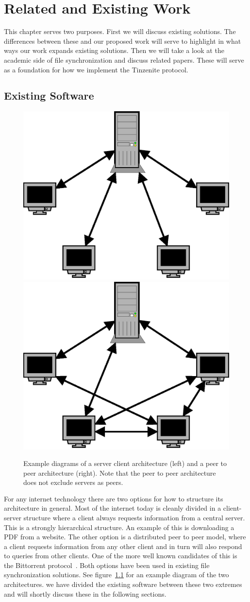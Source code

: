 \chapter{Related and Existing Work}
\label{chap:Related and Existing Work}

This chapter serves two purposes.
First we will discuss existing solutions.
The differences between these and our proposed work will serve to highlight in what ways our work expands existing solutions.
Then we will take a look at the academic side of file synchronization and discuss related papers.
These will serve as a foundation for how we implement the Tinzenite protocol.

\section{Existing Software}
\label{sec:Existing Software}

\begin{figure}[htp]
\centering
    \includegraphics[width=0.3\linewidth]{diagram/topo_s2c}
    \hspace{2em}
    \includegraphics[width=0.3\linewidth]{diagram/topo_p2p}
\caption[Example Network Structures]{Example diagrams of a server client architecture (left) and a peer to peer architecture (right). Note that the peer to peer architecture does not exclude servers as peers.}
\label{fig:example_netarch}
\end{figure}

For any internet technology there are two options for how to structure its architecture in general.
Most of the internet today is cleanly divided in a client-server structure where a client always requests information from a central server.
This is a strongly hierarchical structure.
An example of this is downloading a PDF from a website.
The other option is a distributed peer to peer model, where a client requests information from any other client and in turn will also respond to queries from other clients.
One of the more well known candidates of this is the Bittorrent protocol~\cite{web:site:bittorrent}.
Both options have been used in existing file synchronization solutions.
See figure~\ref{fig:example_netarch} for an example diagram of the two architectures.
we have divided the existing software between these two extremes and will shortly discuss these in the following sections.

